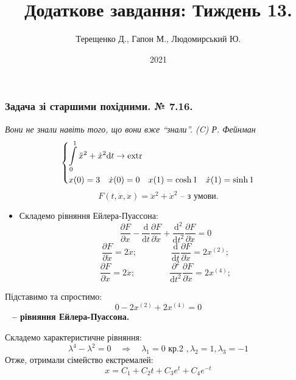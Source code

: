 \documentclass{beamer}
\title{Додаткове завдання: Тиждень 13.}
\author{Терещенко Д., Гапон М., Людомирський Ю.}
\institute{KA-96, IASA}
\date{2021}
\def\d{\partial}
\begin{document}
\frame{\titlepage}

\begin{frame}

\frametitle{Задача зі старшими похідними. № 7.16.}
{\small
\textit{Вони не знали навіть того, що вони вже ``знали''. (C) Р. Фейнман}
}
$$
\begin{dcases}
  \int\limits_{0}^{1}{ \ddot{x}^2 + \dot{x}^2 \mathrm{d} t \to \mathrm{extr}} \\
  x(0) = 3 \quad \dot{x} (0) = 0 \quad x(1) = \cosh{1} \quad \dot{x} (1) = \sinh{1}
\end{dcases}
$$
$$
F(t, \dot{x}, \ddot{x}) =  \ddot{x}^2 + \dot{x}^2 \text{ -- з умови.}
$$
\begin{itemize}
  \item Складемо рівняння Ейлера-Пуассона:
  $$
  \frac{\d F}{\d x} - \frac{\mathrm{d}}{ \mathrm{d} t} \frac{\d F}{\d \dot{x}} + \frac{\mathrm{d}^2}{\mathrm{d} t^2} \frac{\d F }{\d \ddot{x}} = 0
  $$
  $$
  \frac{\d F}{\d \dot{x}} = 2 \dot{x} ; \qquad \qquad \frac{\mathrm{d}}{\mathrm{d} t} \frac{\d F}{\d \dot{x}} = 2 x^{(2)};
  $$
  $$
  \frac{\d F}{\d \ddot{x}} = 2 \ddot{x} ; \qquad \qquad \frac{\d^2}{\mathrm{d} t^2} \frac{\d F}{\d \ddot{x}} = 2x^{(4)}  ;
  $$
\end{itemize}
\end{frame}


\begin{frame}
Підставимо та спростимо:
$$
0 -  2 x^{(2)} + 2 x^{(4)} = 0
$$
 \ \textbf{ -- рівняння Ейлера-Пуассона.}

Складемо характеристичне рівняння:
$$
\lambda^4 - \lambda^2 = 0 \quad \Longrightarrow \quad \lambda_1=0 \text{ кр.2 }, \lambda_2 = 1, \lambda_3 = -1
$$
Отже, отримали \alert{сімейство екстремалей:}
$$
x = C_1 + C_2 t + C_3 e^{t} + C_4 e^{-t}
$$
\end{frame}
\end{document}
